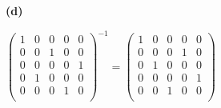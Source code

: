 \documentclass[oneside,12pt]{amsart}
\begin{document}
\bigskip

\textbf{(d)}

$
\begin{pmatrix}
1 & 0 & 0 & 0 & 0 \\
0 & 0 & 1 & 0 & 0 \\
0 & 0 & 0 & 0 & 1 \\
0 & 1 & 0 & 0 & 0 \\
0 & 0 & 0 & 1 & 0 \\
\end{pmatrix}^{-1}=
\begin{pmatrix}
1 & 0 & 0 & 0 & 0 \\
0 & 0 & 0 & 1 & 0 \\
0 & 1 & 0 & 0 & 0 \\
0 & 0 & 0 & 0 & 1 \\
0 & 0 & 1 & 0 & 0 \\
\end{pmatrix}
$
\end{document}
